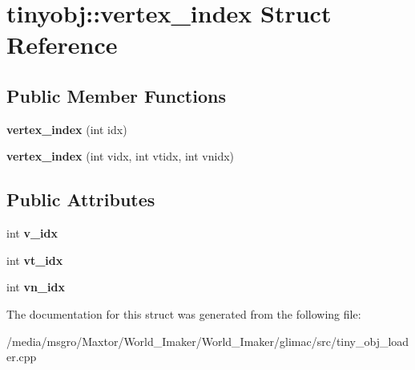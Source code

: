\hypertarget{structtinyobj_1_1vertex__index}{}\section{tinyobj\+:\+:vertex\+\_\+index Struct Reference}
\label{structtinyobj_1_1vertex__index}
\subsection*{Public Member Functions}
\begin{DoxyCompactItemize}
\item 
\mbox{\label{structtinyobj_1_1vertex__index_a894075fa64d32082219c138f111e4753}} 
{\bfseries vertex\+\_\+index} (int idx)
\item 
\mbox{\label{structtinyobj_1_1vertex__index_aa3c4d6bcba36c2abb06e25497a1376a1}} 
{\bfseries vertex\+\_\+index} (int vidx, int vtidx, int vnidx)
\end{DoxyCompactItemize}
\subsection*{Public Attributes}
\begin{DoxyCompactItemize}
\item 
\mbox{\label{structtinyobj_1_1vertex__index_a91a2616fb97e0da915a40654edf9b558}} 
int {\bfseries v\+\_\+idx}
\item 
\mbox{\label{structtinyobj_1_1vertex__index_aae7e058d3aa0993aa05e95d82dd6b8bf}} 
int {\bfseries vt\+\_\+idx}
\item 
\mbox{\label{structtinyobj_1_1vertex__index_a30f2a63a5ed20cc3ad64e340c4020da8}} 
int {\bfseries vn\+\_\+idx}
\end{DoxyCompactItemize}


The documentation for this struct was generated from the following file\+:\begin{DoxyCompactItemize}
\item 
/media/msgro/\+Maxtor/\+World\+\_\+\+Imaker/\+World\+\_\+\+Imaker/glimac/src/tiny\+\_\+obj\+\_\+loader.\+cpp\end{DoxyCompactItemize}
